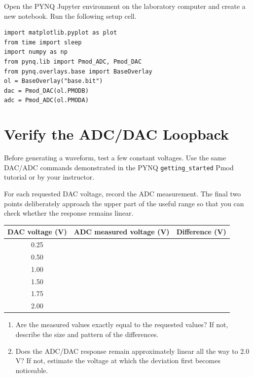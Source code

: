 \documentclass[11pt]{article}
\begin{document}
Open the PYNQ Jupyter environment on the laboratory computer and create a new notebook. Run the following setup cell.

\begin{lstlisting}[style=python]
%matplotlib inline
import matplotlib.pyplot as plot
from time import sleep
import numpy as np
from pynq.lib import Pmod_ADC, Pmod_DAC
from pynq.overlays.base import BaseOverlay
ol = BaseOverlay("base.bit")
dac = Pmod_DAC(ol.PMODB)
adc = Pmod_ADC(ol.PMODA)
\end{lstlisting}

\section{Verify the ADC/DAC Loopback}

Before generating a waveform, test a few constant voltages. Use the same DAC/ADC commands demonstrated in the PYNQ \texttt{getting\_started} Pmod tutorial or by your instructor.

For each requested DAC voltage, record the ADC measurement. The final two points deliberately approach the upper part of the useful range so that you can check whether the response remains linear.

\begin{center}
\renewcommand{\arraystretch}{1.3}
\begin{tabular}{ccc}
\toprule
\textbf{DAC voltage (V)} & \textbf{ADC measured voltage (V)} & \textbf{Difference (V)} \\
\midrule
0.25 & & \\
0.50 & & \\
1.00 & & \\
1.50 & & \\
1.75 & & \\
2.00 & & \\
\bottomrule
\end{tabular}
\end{center}

\begin{enumerate}[label=\alph*)]
    \item Are the measured values exactly equal to the requested values? If not, describe the size and pattern of the differences.
    \item Does the ADC/DAC response remain approximately linear all the way to $2.0\,$V? If not, estimate the voltage at which the deviation first becomes noticeable.
\end{enumerate}
\end{document}
